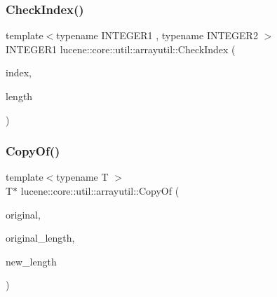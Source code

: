 \mbox{\label{namespacelucene_1_1core_1_1util_1_1arrayutil_a0cd5572d14e7d2e96ae4a5d055267610}} 
\subsubsection{\texorpdfstring{Check\+Index()}{CheckIndex()}}
{\footnotesize\ttfamily template$<$typename I\+N\+T\+E\+G\+E\+R1 , typename I\+N\+T\+E\+G\+E\+R2 $>$ \\
I\+N\+T\+E\+G\+E\+R1 lucene\+::core\+::util\+::arrayutil\+::\+Check\+Index (\begin{DoxyParamCaption}\item[{\mbox{\hyperlink{ZlibCrc32_8h_a2c212835823e3c54a8ab6d95c652660e}{const}} I\+N\+T\+E\+G\+E\+R1}]{index,  }\item[{\mbox{\hyperlink{ZlibCrc32_8h_a2c212835823e3c54a8ab6d95c652660e}{const}} I\+N\+T\+E\+G\+E\+R2}]{length }\end{DoxyParamCaption})}

\mbox{\label{namespacelucene_1_1core_1_1util_1_1arrayutil_a42793db2e08af25c01c19eb099ec7d1d}} 
\subsubsection{\texorpdfstring{Copy\+Of()}{CopyOf()}\hspace{0.1cm}{\footnotesize\ttfamily [1/2]}}
{\footnotesize\ttfamily template$<$typename T $>$ \\
T$\ast$ lucene\+::core\+::util\+::arrayutil\+::\+Copy\+Of (\begin{DoxyParamCaption}\item[{\mbox{\hyperlink{ZlibCrc32_8h_a2c212835823e3c54a8ab6d95c652660e}{const}} T $\ast$}]{original,  }\item[{\mbox{\hyperlink{ZlibCrc32_8h_a2c212835823e3c54a8ab6d95c652660e}{const}} uint32\+\_\+t}]{original\+\_\+length,  }\item[{\mbox{\hyperlink{ZlibCrc32_8h_a2c212835823e3c54a8ab6d95c652660e}{const}} uint32\+\_\+t}]{new\+\_\+length }\end{DoxyParamCaption})}

